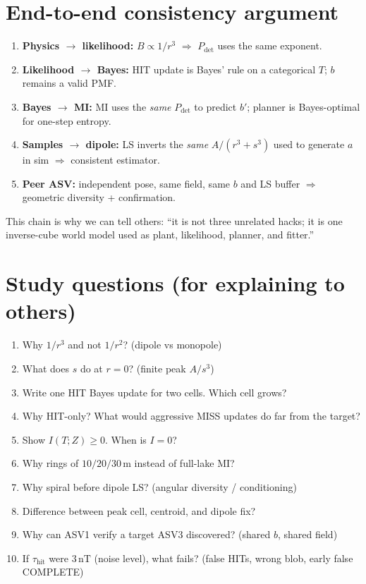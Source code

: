 \documentclass[11pt,a4paper]{article}
\begin{document}
\section{End-to-end consistency argument}

\begin{enumerate}[leftmargin=*]
  \item \textbf{Physics \(\to\) likelihood:} \(B\propto 1/r^{3}\) \(\Rightarrow\)
        \(P_{\mathrm{det}}\) uses the same exponent.
  \item \textbf{Likelihood \(\to\) Bayes:} HIT update is Bayes' rule on a
        categorical \(T\); \(b\) remains a valid PMF.
  \item \textbf{Bayes \(\to\) MI:} MI uses the \emph{same} \(P_{\mathrm{det}}\)
        to predict \(b'\); planner is Bayes-optimal for one-step entropy.
  \item \textbf{Samples \(\to\) dipole:} LS inverts the \emph{same} \(A/(r^{3}+s^{3})\)
        used to generate \(a\) in sim \(\Rightarrow\) consistent estimator.
  \item \textbf{Peer ASV:} independent pose, same field, same \(b\) and LS
        buffer \(\Rightarrow\) geometric diversity + confirmation.
\end{enumerate}
This chain is why we can tell others: ``it is not three unrelated hacks; it is
one inverse-cube world model used as plant, likelihood, planner, and fitter.''

\section{Study questions (for explaining to others)}
\begin{enumerate}[leftmargin=*]
  \item Why \(1/r^{3}\) and not \(1/r^{2}\)? (dipole vs monopole)
  \item What does \(s\) do at \(r=0\)? (finite peak \(A/s^{3}\))
  \item Write one HIT Bayes update for two cells. Which cell grows?
  \item Why HIT-only? What would aggressive MISS updates do far from the target?
  \item Show \(I(T;Z)\ge 0\). When is \(I=0\)?
  \item Why rings of \(10/20/30\,\mathrm{m}\) instead of full-lake MI?
  \item Why spiral before dipole LS? (angular diversity / conditioning)
  \item Difference between peak cell, centroid, and dipole fix?
  \item Why can ASV1 verify a target ASV3 discovered? (shared \(b\), shared field)
  \item If \(\tau_{\mathrm{hit}}\) were \(3\,\mathrm{nT}\) (noise level), what
        fails? (false HITs, wrong blob, early false COMPLETE)
\end{enumerate}
\end{document}
